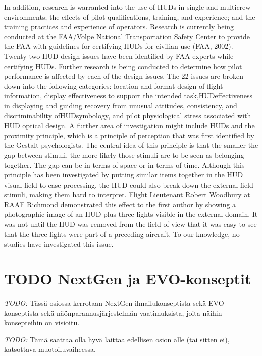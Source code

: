 \documentclass[utf8,bachelor,manualbib]{gradu3}
\begin{document}
In addition, research is
warranted into the use of HUDs in single and multicrew environments; the effects
of pilot qualifications, training, and experience; and the training practices
and experience of operators.
Research is currently being conducted at the FAA/Volpe National Transportation
Safety Center to provide the FAA with guidelines for certifying HUDs for civilian
use (FAA, 2002). Twenty-two HUD design issues have been identified by
FAA experts while certifying HUDs. Further research is being conducted to determine
how pilot performance is affected by each of the design issues. The 22 issues
are broken down into the following categories: location and format design of flight
information, display effectiveness to support the intended task,HUDeffectiveness
in displaying and guiding recovery from unusual attitudes, consistency, and
discriminability ofHUDsymbology, and pilot physiological stress associated with
HUD optical design.
A further area of investigation might include HUDs and the proximity principle,
which is a principle of perception that was first identified by the Gestalt psychologists.
The central idea of this principle is that the smaller the gap between
stimuli, the more likely those stimuli are to be seen as belonging together. The gap
can be in terms of space or in terms of time. Although this principle has been investigated
by putting similar items together in the HUD visual field to ease processing,
the HUD could also break down the external field stimuli, making them hard
to interpret. Flight Lieutenant Robert Woodbury at RAAF Richmond demonstrated
this effect to the first author by showing a photographic image of an HUD
plus three lights visible in the external domain. It was not until the HUD was removed from the field of view that it was easy to see that the three lights were part of
a preceding aircraft. To our knowledge, no studies have investigated this issue. \citep{crawford2006}


\section{TODO NextGen ja EVO-konseptit}

\emph{TODO:}
Tässä osiossa kerrotaan NextGen-ilmailukonseptista sekä EVO-konseptista sekä näönparannusjärjestelmän vaatimuksista, joita näihin konsepteihin on visioitu.

\emph{TODO:}
Tämä saattaa olla hyvä laittaa edellisen osion alle (tai sitten ei), katsottava muotoiluvaiheessa.
\end{document}
